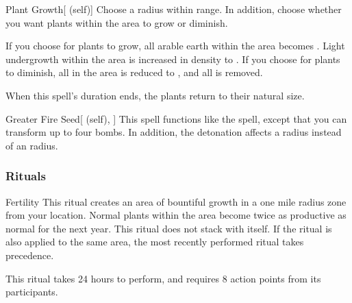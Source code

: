 \lowercase{\hypertarget{spell:Plant Growth}{}}\label{spell:Plant Growth}
\begin{attuneability}[\nth{2}]{\hypertarget{spell:Plant Growth}{Plant Growth}}[ (self)]
Choose a \arealarge radius within \rnglong range.
In addition, choose whether you want plants within the area to grow or diminish.

If you choose for plants to grow, all arable earth within the area becomes .
Light undergrowth within the area is increased in density to .
If you choose for plants to diminish, all  in the area is reduced to , and all  is removed.

When this spell's duration ends, the plants return to their natural size.
\end{attuneability}
\vspace{0.25em}



\lowercase{\hypertarget{spell:Greater Fire Seed}{}}\label{spell:Greater Fire Seed}
\begin{attuneability}[\nth{4}]{\hypertarget{spell:Greater Fire Seed}{Greater Fire Seed}}[ (self), ]
This spell functions like the  spell, except that you can transform up to four bombs.
In addition, the detonation affects a \areamed radius instead of an \areasmall radius.
\end{attuneability}
\vspace{0.25em}



\subsubsection{Rituals}


\lowercase{\hypertarget{spell:Fertility}{}}\label{spell:Fertility}
\begin{apability}[\nth{2}]{\hypertarget{spell:Fertility}{Fertility}}
This ritual creates an area of bountiful growth in a one mile radius zone from your location.
Normal plants within the area become twice as productive as normal for the next year.
This ritual does not stack with itself.
If the  ritual is also applied to the same area, the most recently performed ritual takes precedence.

This ritual takes 24 hours to perform, and requires 8 action points from its participants.
\end{apability}
\vspace{0.25em}



